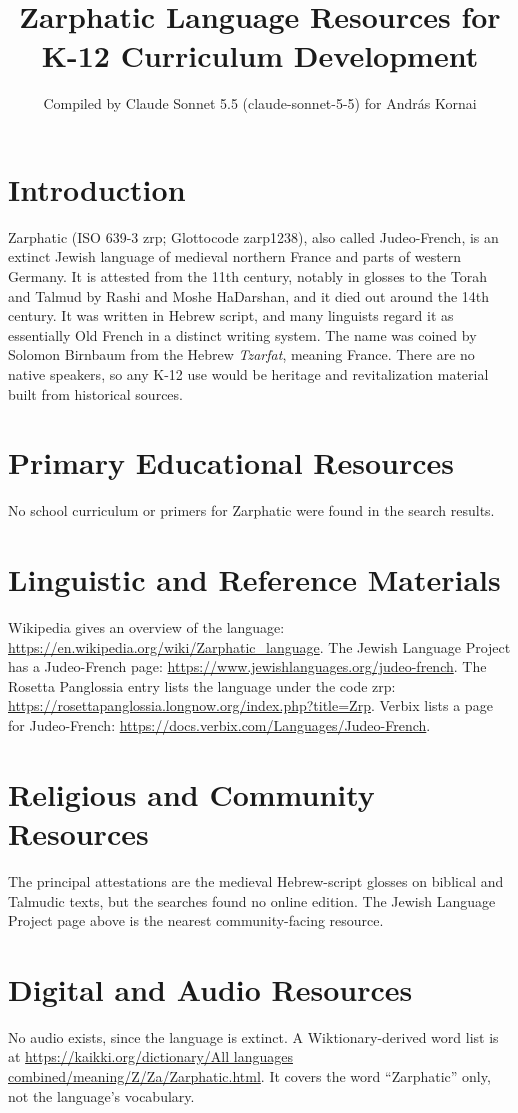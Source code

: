 \documentclass[12pt]{article}
\title{Zarphatic Language Resources for K-12 Curriculum Development}
\author{Compiled by Claude Sonnet 5.5 (claude-sonnet-5-5) for Andr\'as Kornai}
\date{}
\begin{document}
\maketitle

\section{Introduction}
Zarphatic (ISO 639-3 zrp; Glottocode zarp1238), also called Judeo-French, is an extinct Jewish language of medieval northern France and parts of western Germany. It is attested from the 11th century, notably in glosses to the Torah and Talmud by Rashi and Moshe HaDarshan, and it died out around the 14th century. It was written in Hebrew script, and many linguists regard it as essentially Old French in a distinct writing system. The name was coined by Solomon Birnbaum from the Hebrew \emph{Tzarfat}, meaning France. There are no native speakers, so any K-12 use would be heritage and revitalization material built from historical sources.

\section{Primary Educational Resources}
No school curriculum or primers for Zarphatic were found in the search results.

\section{Linguistic and Reference Materials}
Wikipedia gives an overview of the language: \url{https://en.wikipedia.org/wiki/Zarphatic_language}. The Jewish Language Project has a Judeo-French page: \url{https://www.jewishlanguages.org/judeo-french}. The Rosetta Panglossia entry lists the language under the code zrp: \url{https://rosettapanglossia.longnow.org/index.php?title=Zrp}. Verbix lists a page for Judeo-French: \url{https://docs.verbix.com/Languages/Judeo-French}.

\section{Religious and Community Resources}
The principal attestations are the medieval Hebrew-script glosses on biblical and Talmudic texts, but the searches found no online edition. The Jewish Language Project page above is the nearest community-facing resource.

\section{Digital and Audio Resources}
No audio exists, since the language is extinct. A Wiktionary-derived word list is at \url{https://kaikki.org/dictionary/All languages combined/meaning/Z/Za/Zarphatic.html}. It covers the word ``Zarphatic'' only, not the language's vocabulary.
\end{document}
